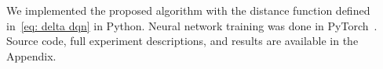 \documentclass[letterpaper]{article} %
\begin{document}
We implemented the proposed algorithm with the distance function defined in~\cref{eq: delta dqn} in Python. %
Neural network training was done in PyTorch~\cite{paszke2015}.
Source code, full experiment descriptions, and results are available in the Appendix.
\end{document}
